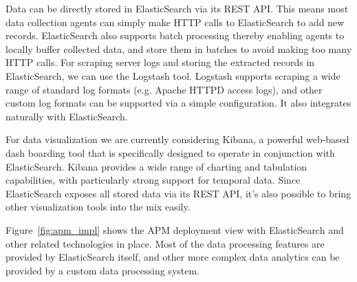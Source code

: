 \documentclass[11pt]{article}
\begin{document}
Data can be directly stored in ElasticSearch via its REST API. This means most data collection agents can 
simply make HTTP calls to ElasticSearch to add new records. ElasticSearch also supports batch 
processing thereby enabling agents to locally buffer collected data, and store them in batches to avoid
making too many HTTP calls. For scraping server logs and storing the extracted records in ElasticSearch,
we can use the Logstash tool. Logstash supports scraping a wide range of standard log formats (e.g. 
Apache HTTPD access logs), and other custom log formats can be supported via a simple configuration.
It also integrates naturally with ElasticSearch.

For data visualization we are currently considering Kibana, a powerful web-based dash boarding tool 
that is specifically designed to operate in conjunction with ElasticSearch. Kibana provides a wide
range of charting and tabulation capabilities, with particularly strong support for temporal data.  Since
ElasticSearch exposes all stored data via its REST API, it's also possible to bring other visualization
tools into the mix easily.

Figure~\ref{fig:apm_impl} shows the APM deployment view with ElasticSearch and other related technologies
in place. Most of the data processing features are provided by ElasticSearch itself, and other more complex
data analytics can be provided by a custom data processing system. 
\end{document}
